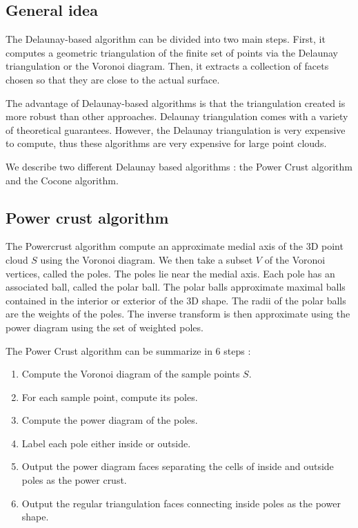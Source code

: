 \documentclass[a4paper]{article}
\begin{document}
\subsection{General idea}
The Delaunay-based algorithm can be divided into two main steps. First, it computes a geometric triangulation of the finite set of points via the Delaunay triangulation or the Voronoi diagram. Then, it extracts a collection of facets chosen so that they are close to the actual surface.

The advantage of Delaunay-based algorithms is that the triangulation created is more robust than other approaches. Delaunay triangulation comes with a variety of theoretical guarantees. However, the Delaunay triangulation is very expensive to compute, thus these algorithms are very expensive for large point clouds.

We describe two different Delaunay based algorithms : the Power Crust algorithm and the Cocone algorithm.

\subsection{Power crust algorithm}
\label{subsec:pca}
The Powercrust algorithm compute an approximate medial axis of the 3D point cloud $S$ using the Voronoi diagram. We then take a subset $V$ of the Voronoi vertices, called the poles. The poles lie near the medial axis. Each pole has an associated ball, called the polar ball. The polar balls approximate maximal balls contained in the interior or exterior of the 3D shape. The radii of the polar balls are the weights of the poles. The inverse transform is then approximate using the power diagram using the set of weighted poles.

The Power Crust algorithm can be summarize in 6 steps :
\begin{enumerate}
\item Compute the Voronoi diagram of the sample points $S$.
\item For each sample point, compute its poles.
\item Compute the power diagram of the poles.
\item Label each pole either inside or outside.
\item Output the power diagram faces separating the cells of inside and outside poles as the power crust.
\item Output the regular triangulation faces connecting inside poles as the power shape.
\end{enumerate}
\end{document}
